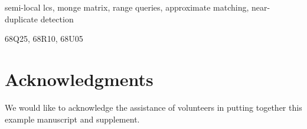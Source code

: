 \documentclass[review,onefignum,onetabnum]{siamart190516}
\begin{document}
\maketitle



\begin{keywords}
  semi-local lcs, monge matrix, range queries, approximate matching, near-duplicate detection
\end{keywords}

\begin{AMS}
  68Q25, 68R10, 68U05
\end{AMS}





%



\section*{Acknowledgments}
We would like to acknowledge the assistance of volunteers in putting
together this example manuscript and supplement.



\end{document}
